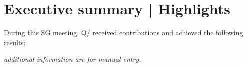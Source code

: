 
\section{Executive summary | Highlights}\label{executive-summary-highlights}



During this SG{\studyGroup} meeting, Q{\questions}/{\studyGroup} received {\nbContributions} contributions and achieved the following results:

\listQuestionContributions

\textit{additional information are for manual entry.}